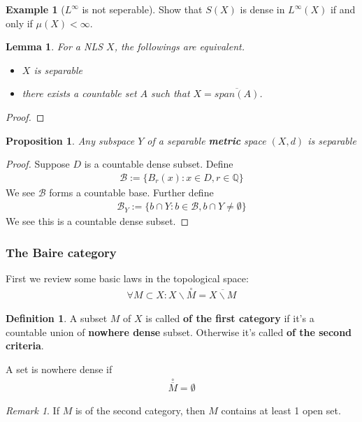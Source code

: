 \documentclass[a4paper,11pt,fleqn]{book}
\newtheorem{lemma}[theorem]{Lemma}
\newtheorem{proposition}[theorem]{Proposition}
\theoremstyle{definition}
\newtheorem{definition}{Definition}[section]
\newtheorem*{example}{Example}
\theoremstyle{remark}
\newtheorem*{remark}{Remark}
\begin{document}
\begin{example}[$L^\infty$ is not seperable]
Show that $S(X)$ is dense in $L^\infty(X)$ if and only if $\mu(X) < \infty$.	
\end{example}

\begin{lemma}
	For a NLS $X$, the followings are equivalent.
	\begin{itemize}
		\item $X$ is separable
		\item there exists a countable set $A$ such that $X = \overline{span(A)}$.
	\end{itemize}
\end{lemma}
\begin{proof}
	
\end{proof}


\begin{proposition}
Any subspace $Y$ of a separable \textbf{metric }space $(X, d)$ is separable
\end{proposition}
\begin{proof}
	Suppose $D$ is a countable dense subset. Define
	\begin{align*}
		\mathcal{B}:= \{ B_r(x): x \in D, r \in \mathbb{Q} \}
	\end{align*}
	We see $\mathcal{B}$ forms a countable base. Further define
	\begin{align*}
		\mathcal{B}_Y:= \{ b \cap Y: b \in \mathcal{B}, b \cap Y \neq \emptyset \}
	\end{align*}
	We see this is a countable dense subset.
\end{proof}


\subsubsection{The Baire category}
First we review some basic laws in the topological space:
\begin{align*}
	\forall M \subset X: X \backslash \overset{\circ}{M} = \overline{ X \backslash M}
\end{align*}
\begin{definition}
	A subset $M$ of $X$ is called \textbf{of the first category} if it's a countable union of \textbf{nowhere dense} subset. Otherwise it's called \textbf{of the second criteria}.\par 
	A set is nowhere dense if 
	\begin{align*}
		\overset{\circ}{\overline{M}} = \emptyset 
	\end{align*}
\end{definition}
\begin{remark}
If $M$ is of the second category, then $M$ contains at least 1 open set. 	
\end{remark}
\end{document}
